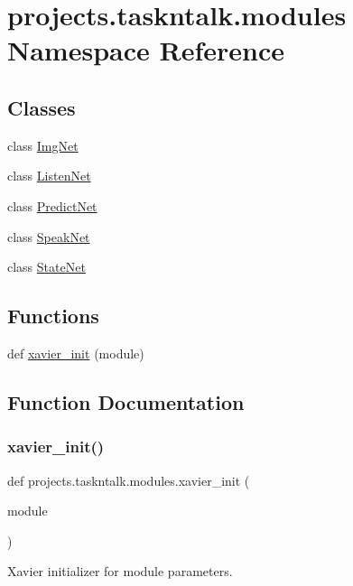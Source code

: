 \hypertarget{namespaceprojects_1_1taskntalk_1_1modules}{}\section{projects.\+taskntalk.\+modules Namespace Reference}
\label{namespaceprojects_1_1taskntalk_1_1modules}
\subsection*{Classes}
\begin{DoxyCompactItemize}
\item 
class \hyperlink{classprojects_1_1taskntalk_1_1modules_1_1ImgNet}{Img\+Net}
\item 
class \hyperlink{classprojects_1_1taskntalk_1_1modules_1_1ListenNet}{Listen\+Net}
\item 
class \hyperlink{classprojects_1_1taskntalk_1_1modules_1_1PredictNet}{Predict\+Net}
\item 
class \hyperlink{classprojects_1_1taskntalk_1_1modules_1_1SpeakNet}{Speak\+Net}
\item 
class \hyperlink{classprojects_1_1taskntalk_1_1modules_1_1StateNet}{State\+Net}
\end{DoxyCompactItemize}
\subsection*{Functions}
\begin{DoxyCompactItemize}
\item 
def \hyperlink{namespaceprojects_1_1taskntalk_1_1modules_a483197f0d561a3d1ef7d04a2de70e571}{xavier\+\_\+init} (module)
\end{DoxyCompactItemize}


\subsection{Function Documentation}
\mbox{\label{namespaceprojects_1_1taskntalk_1_1modules_a483197f0d561a3d1ef7d04a2de70e571}} 
\subsubsection{\texorpdfstring{xavier\+\_\+init()}{xavier\_init()}}
{\footnotesize\ttfamily def projects.\+taskntalk.\+modules.\+xavier\+\_\+init (\begin{DoxyParamCaption}\item[{}]{module }\end{DoxyParamCaption})}

\begin{DoxyVerb}Xavier initializer for module parameters.
\end{DoxyVerb}
 